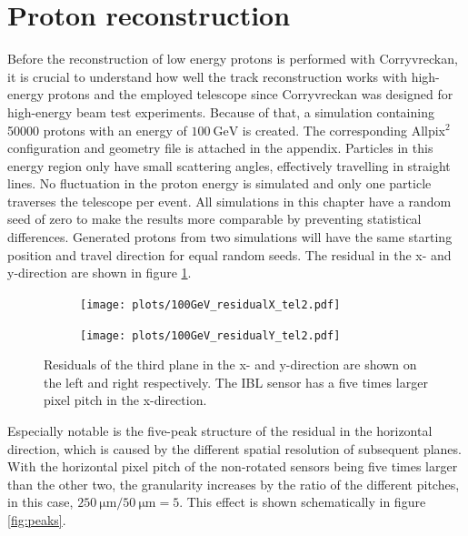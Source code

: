 \section{Proton reconstruction}\label{sec:proton_reconstruction}
Before the reconstruction of low energy protons is performed with Corryvreckan, it is crucial to understand how well the
track reconstruction works with high-energy protons and the employed telescope since Corryvreckan was designed for high-energy beam test experiments.
Because of that, a simulation containing 50000 protons
with an energy of $\SI{100}{\giga\eV}$ is created. The corresponding Allpix$^2$ configuration and geometry file is attached in the appendix.
Particles in this energy region only have small scattering angles, effectively travelling
in straight lines.
No fluctuation in the proton energy is simulated and only one particle traverses
the telescope per event. All simulations in this chapter have a random seed of zero to make the results more comparable by preventing
statistical differences. Generated protons from two simulations will have the same starting position and travel direction for equal random seeds.
The residual in the x- and y-direction are shown in figure \ref{fig:100GeV}.

\begin{figure}
  \hspace{-0.6cm}
  \begin{subfigure}{0.51\textwidth}
      \centering
      \texttt{[image: plots/100GeV\_residualX\_tel2.pdf]}
  \end{subfigure}
  \begin{subfigure}{0.51\textwidth}
      \texttt{[image: plots/100GeV\_residualY\_tel2.pdf]}
  \end{subfigure}
  \caption{Residuals of the third plane in the x- and y-direction are shown on the left and right respectively.
  The IBL sensor has a five times larger pixel pitch in the x-direction. }
  \label{fig:100GeV}
\end{figure}

Especially notable is the five-peak structure of the residual in the horizontal direction, which is caused by the different
spatial resolution of subsequent planes. With the horizontal pixel pitch of the non-rotated sensors being
five times larger than the other two, the granularity increases by the ratio of the different pitches, in this case,
$\SI{250}{\micro\meter}/\SI{50}{\micro\meter} = 5$. This effect is shown schematically in figure \ref{fig:peaks}.

